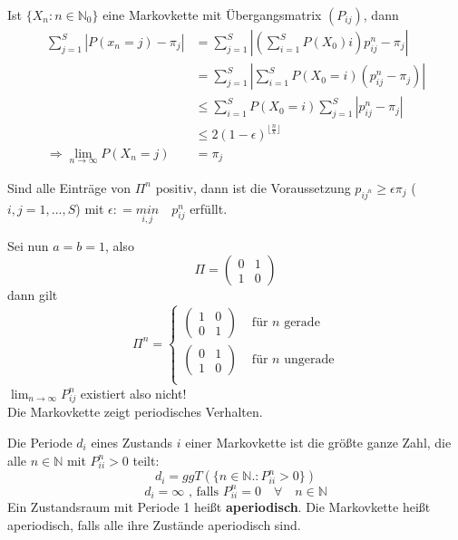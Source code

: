 \documentclass[a4paper,12pt]{article}
\begin{document}
Ist $\{X_n: n \in \mathbb{N}_0\}$ eine Markovkette mit Übergangsmatrix $(P_{ij})$, dann
\begin{align*}
	\sum_{j=1}^{S} | P(x_n = j) - \pi_j   |   & = \sum_{j=1}^{S} | (\sum_{i=1}^{S}P(X_0 ) i)p_{ij}^n - \pi_j   |  \\
	                                          & = \sum_{j=1}^{S}|\sum_{i=1}^{S} P(X_0 = i)(p_{ij}^n - \pi_j)  |   \\
	                                          & \leq \sum_{i=1}^{S}P(X_0 = i)\sum_{j=1}^{S} |p_{ij}^n - \pi_j   | \\
	                                          & \leq 2(1-\epsilon)^{\lfloor\frac{n}{k} \rfloor}                   \\
	\Rightarrow \lim_{n \to \infty}P(X_n = j) & = \pi_j
\end{align*}


Sind alle Einträge von $\Pi^n$ positiv, dann ist die Voraussetzung $p_{ij^n} \geq \epsilon \pi_j$ ($i,j = 1, ..., S$)
mit $\epsilon: = \underset{i,j}{min} \quad p_{ij}^n$ erfüllt.



\begin{tcolorbox}[breakable, colframe=blue, colback=white, title=Beispiel 11 (Fortsetzung)]
	Sei nun $a = b = 1$, also
	$$
		\Pi = \begin{pmatrix}
			0 & 1 \\
			1 & 0
		\end{pmatrix}
	$$
	dann gilt
	$$
		\Pi^n =
		\begin{cases}
			\begin{pmatrix}1 & 0 \\ 0 & 1 \end{pmatrix} & \text{ für $n$ gerade}   \\
			\begin{pmatrix}0 & 1 \\ 1 & 0 \end{pmatrix} & \text{ für $n$ ungerade} \\
		\end{cases}
	$$
	$\lim_{n \to \infty}P_{ij}^n$ existiert also nicht!\\
	Die Markovkette zeigt periodisches Verhalten.
\end{tcolorbox}


Die Periode $d_i$ eines Zustands $i$ einer Markovkette ist
die größte ganze Zahl, die alle $n \in \mathbb{N}$ mit $P_{ii}^n > 0$ teilt:
$$
	d_i = ggT\left(\{n \in \mathbb{N}.: P_{ii}^n >0\}\right)
$$
$$
	d_i = \infty \text{ , falls } P_{ii}^n = 0 \quad \forall \quad n \in \mathbb{N}
$$
Ein Zustandsraum mit Periode 1 heißt \textbf{aperiodisch}. Die Markovkette heißt aperiodisch,
falls alle ihre Zustände aperiodisch sind.
\end{document}
